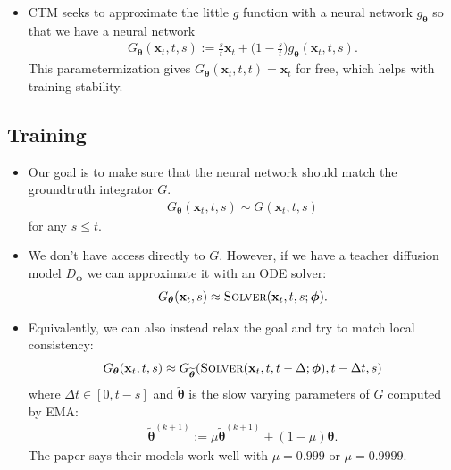 \documentclass[10pt]{article}
\newcommand{\ve}[1]{\mathbf{#1}}
\newcommand{\ves}[1]{\boldsymbol{#1}}
\begin{document}
\begin{itemize}
  \item CTM seeks to approximate the little $g$ function with a neural network $g_{\ves{\theta}}$ so that we have a neural network
  \begin{align*}
    G_{\ves{\theta}}(\ve{x}_t, t, s) := \frac{s}{t} \ve{x}_t + \bigg(1 - \frac{s}{t}\bigg)g_{\ves{\theta}}(\ve{x}_t, t, s).
  \end{align*}
  This parametermization gives $G_{\ves{\theta}}(\ve{x}_t, t, t) = \ve{x}_t$ for free, which helps with training stability.
\end{itemize}

\subsection{Training}

\begin{itemize}
  \item Our goal is to make sure that the neural network should match the groundtruth integrator $G$.
  \begin{align*}
    G_{\ves{\theta}}(\ve{x}_t, t, s) \sim G(\ve{x}_t, t, s)
  \end{align*}
  for any $s \leq t$. 

  \item We don't have access directly to $G$. However, if we have a teacher diffusion model $D_{\ves{\phi}}$ we can approximate it with an ODE solver:
  \begin{align}
    G_{\ves{\theta}}(\ve{x}_t, s) \approx \textsc{Solver}(\ve{x}_t, t, s; \ves{\phi}). \label{eqn:global-consistency-matching}
  \end{align}
  
  \item Equivalently, we can also instead relax the goal and try to match local consistency:
  \begin{align}
    G_{\ves{\theta}}(\ve{x}_t, t, s) \approx G_{\widetilde{\ves{\theta}}}(\textsc{Solver}(\ve{x}_t, t, t-\Delta; \ves{\phi}), t-\Delta t, s) \label{eqn:local-consistency-matching}
  \end{align}
  where $\Delta t \in [0, t-s]$ and $\widetilde{\ves{\theta}}$ is the slow varying parameters of $G$ computed by EMA:
  \begin{align*}
    \widetilde{\ves{\theta}}^{(k+1)} := \mu \widetilde{\ves{\theta}}^{(k+1)} + (1-\mu)\ves{\theta}.
  \end{align*}
  The paper says their models work well with $\mu = 0.999$ or $\mu = 0.9999$.


\end{itemize}
\end{document}
